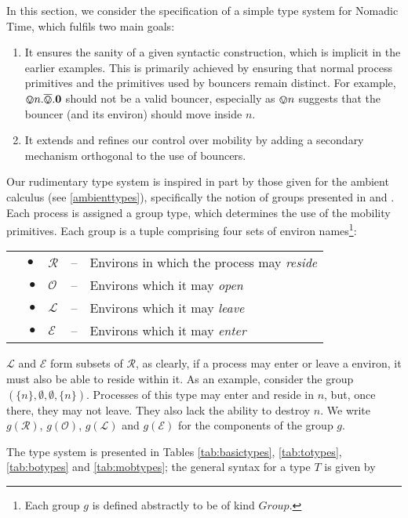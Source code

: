 In this section, we consider the specification of a simple type
system for Nomadic Time, which fulfils two main goals:

\begin{enumerate}
\item It ensures the sanity of a given syntactic construction, which
  is implicit in the earlier examples.  This is primarily achieved by
  ensuring that normal process primitives and the primitives used by
  bouncers remain distinct.  For example, $\varovee n.\overline{\varovee}.\textbf{0}$ should
  not be a valid bouncer, especially as $\varovee n$ suggests that the
  bouncer (and its environ) should move inside $n$.
\item It extends and refines our control over mobility by adding a
      secondary mechanism orthogonal to the use of bouncers.
\end{enumerate}

Our rudimentary type system is inspired in part by those given for the
ambient calculus (see \ref{ambienttypes}), specifically the notion of
groups presented in \cite{ambienttypes} and \cite{m3}.  Each process is
assigned a group type, which determines the use of the mobility
primitives.  Each group is a tuple comprising four sets of environ
names\footnote{Each group $g$ is defined abstractly to be of kind
$Group$.}:

\begin{tabular}{rlcl}
$\quad \bullet$ & $\mathscr{R}$ & -- & Environs in which the process may
 \emph{reside} \\
$\bullet$ & $\mathscr{O}$ & -- & Environs which it may \emph{open} \\
$\bullet$ & $\mathscr{L}$ & -- & Environs which it may \emph{leave} \\
$\bullet$ & $\mathscr{E}$ & -- & Environs which it may \emph{enter}
\end{tabular}

$\mathscr{L}$ and $\mathscr{E}$ form subsets of $\mathscr{R}$, as
clearly, if a process may enter or leave a environ, it must also be able
to reside within it.  As an example, consider the group
$(\{n\},\emptyset, \emptyset,\{n\})$.  Processes of this type may enter
and reside in $n$, but, once there, they may not leave.  They also lack
the ability to destroy $n$.  We write $g(\mathscr{R})$,
$g(\mathscr{O})$, $g(\mathscr{L})$ and $g(\mathscr{E})$ for the
components of the group $g$.

The type system is presented in Tables \ref{tab:basictypes},
\ref{tab:totypes}, \ref{tab:botypes} and \ref{tab:mobtypes}; the
general syntax for a type $T$ is given by


